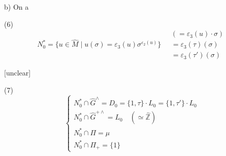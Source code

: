 \begin{enumerate}
b) On a

(6) $$ N_0^* = \{ u \in \hat{M} \mid u(\sigma) = \varepsilon_3(u) \sigma^{\varepsilon_2(u)} \} \quad \begin{array}{l} (= \varepsilon_3(u) \cdot \sigma) \\ = \varepsilon_3(\tau)(\sigma) \\ = \varepsilon_3(\tau')(\sigma) \end{array} $$

[unclear]

(7)
$$
\begin{cases}
N_0^* \cap \widehat{G}^{\wedge} = D_0 = \{1, \tau \} \cdot L_0 = \{1, \tau' \} \cdot L_0 \\
N_0^* \cap \widehat{G}^{+\wedge} = L_0 \quad (\simeq \hat{\mathbb{Z}}) \\
N_0^* \cap \Pi = \mu \\
N_0^* \cap \Pi_+ = \{ 1 \}
\end{cases}
$$

\newpage



\newpage



\newpage



\newpage



\newpage



\newpage



\end{enumerate}
